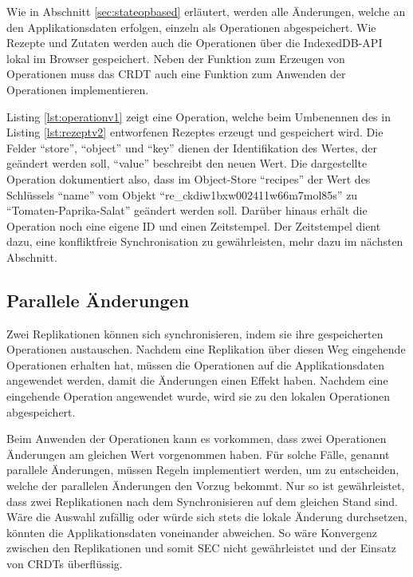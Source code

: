 \documentclass[a4paper, 12pt]{scrreprt}
\begin{document}
Wie in Abschnitt \ref{sec:stateopbased} erläutert, werden alle Änderungen, welche an den Applikationsdaten erfolgen, einzeln als Operationen abgespeichert. Wie Rezepte und Zutaten werden auch die Operationen über die IndexedDB-API lokal im Browser gespeichert. Neben der Funktion zum Erzeugen von Operationen muss das CRDT auch eine Funktion zum Anwenden der Operationen implementieren. 

Listing \ref{lst:operationv1} zeigt eine Operation, welche beim Umbenennen des in Listing \ref{lst:rezeptv2} entworfenen Rezeptes erzeugt und gespeichert wird. Die Felder \enquote{store}, \enquote{object} und  \enquote{key} dienen der Identifikation des Wertes, der geändert werden soll, \enquote{value} beschreibt den neuen Wert. Die dargestellte Operation dokumentiert also, dass im Object-Store \enquote{recipes} der Wert des Schlüssels \enquote{name} vom Objekt \enquote{re\_ckdiw1bxw002411w66m7mol85s} zu \enquote{Tomaten-Paprika-Salat} geändert werden soll. Darüber hinaus erhält die Operation noch eine eigene ID und einen Zeitstempel. Der Zeitstempel dient dazu, eine konfliktfreie Synchronisation zu gewährleisten, mehr dazu im nächsten Abschnitt. 

\begin{minipage}{\linewidth}
	
\end{minipage}

\subsection{Parallele Änderungen}
\label{sec:paralleleÄnderungen}

Zwei Replikationen können sich synchronisieren, indem sie ihre gespeicherten Operationen austauschen. Nachdem eine Replikation über diesen Weg eingehende Operationen erhalten hat, müssen die Operationen auf die Applikationsdaten angewendet werden, damit die Änderungen einen Effekt haben. Nachdem eine eingehende Operation angewendet wurde, wird sie zu den lokalen Operationen abgespeichert.

Beim Anwenden der Operationen kann es vorkommen, dass zwei Operationen Änderungen am gleichen Wert vorgenommen haben. Für solche Fälle, genannt parallele Änderungen, müssen Regeln implementiert werden, um zu entscheiden, welche der parallelen Änderungen den Vorzug bekommt. Nur so ist gewährleistet, dass zwei Replikationen nach dem Synchronisieren auf dem gleichen Stand sind. Wäre die Auswahl zufällig oder würde sich stets die lokale Änderung durchsetzen, könnten die Applikationsdaten voneinander abweichen. So wäre Konvergenz zwischen den Replikationen und somit \ac{SEC} nicht gewährleistet und der Einsatz von \acp{CRDT} überflüssig.
\end{document}
